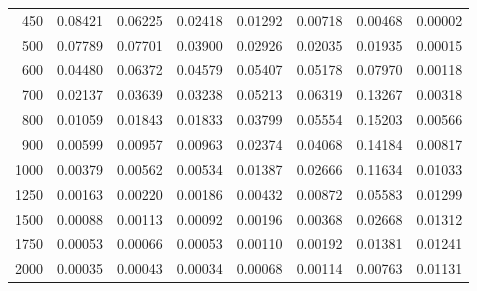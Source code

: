 \begin{table}[ht]
\begin{tabular}{r|c|c|c|c|c|c|c}
      450 & 0.08421 & 0.06225 & 0.02418 & 0.01292 & 0.00718 & 0.00468 & 0.00002 \\
      500 & 0.07789 & 0.07701 & 0.03900 & 0.02926 & 0.02035 & 0.01935 & 0.00015 \\
      600 & 0.04480 & 0.06372 & 0.04579 & 0.05407 & 0.05178 & 0.07970 & 0.00118 \\
      700 & 0.02137 & 0.03639 & 0.03238 & 0.05213 & 0.06319 & 0.13267 & 0.00318 \\
      800 & 0.01059 & 0.01843 & 0.01833 & 0.03799 & 0.05554 & 0.15203 & 0.00566 \\
      900 & 0.00599 & 0.00957 & 0.00963 & 0.02374 & 0.04068 & 0.14184 & 0.00817 \\
     1000 & 0.00379 & 0.00562 & 0.00534 & 0.01387 & 0.02666 & 0.11634 & 0.01033 \\
     1250 & 0.00163 & 0.00220 & 0.00186 & 0.00432 & 0.00872 & 0.05583 & 0.01299 \\
     1500 & 0.00088 & 0.00113 & 0.00092 & 0.00196 & 0.00368 & 0.02668 & 0.01312 \\
     1750 & 0.00053 & 0.00066 & 0.00053 & 0.00110 & 0.00192 & 0.01381 & 0.01241 \\
     2000 & 0.00035 & 0.00043 & 0.00034 & 0.00068 & 0.00114 & 0.00763 & 0.01131 \\ \cline{1-8}
    \end{tabular}
    \label{tab:XRayEffSCX2}
\end{table}

